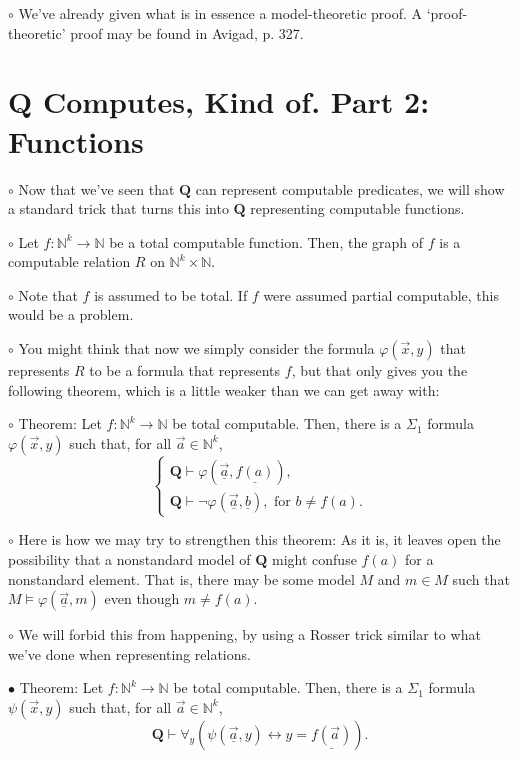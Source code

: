 \documentclass{article}
\newcommand{\N}{\mathbb{N}}
\newcommand{\RQ}{\mathbf{Q}}
\newcommand\Point[1]{\noindent \hspace{\labelsep} {\large $\bullet$ #1} \smallskip}
\newcommand\point[1]{\noindent \hspace{\labelsep} {\small $\circ$ #1} \smallskip}
\newcommand\timestamp[1]{}
\begin{document}
\point{We've already given what is in essence a model-theoretic proof. A `proof-theoretic' proof may be found in Avigad, p. 327.}

\timestamp{80 min}

\section{$\RQ$ Computes, Kind of. Part 2: Functions}

\point{Now that we've seen that $\RQ$ can represent computable predicates, we will show a standard trick that turns this into $\RQ$ representing computable functions.}

\point{Let $f \colon \N^k \to \N$ be a total computable function. Then, the graph of $f$ is a computable relation $R$ on $\N^k \times \N$.}

\point{Note that $f$ is assumed to be total. If $f$ were assumed partial computable, this would be a problem.}

\point{You might think that now we simply consider the formula $\varphi(\vec x, y)$ that represents $R$ to be a formula that represents $f$, but that only gives you the following theorem, which is a little weaker than we can get away with:}

\point{Theorem: Let $f \colon \N^k \to \N$ be total computable. Then, there is a $\Sigma_1$ formula $\varphi(\vec x, y)$ such that, for all $\vec a \in \N^k$,
\begin{equation}
\begin{cases}
\RQ \vdash \varphi(\underline{\vec a}, \underline{f(a)}),\\
\RQ \vdash \neg\varphi(\underline{\vec a}, \underline b), \text{ for $b \neq f(a)$}.
\end{cases}
\end{equation}}

\point{Here is how we may try to strengthen this theorem: As it is, it leaves open the possibility that a nonstandard model of $\RQ$ might confuse $f(a)$ for a nonstandard element. That is, there may be some model $M$ and $m \in M$ such that $M \vDash \varphi(\underline{\vec a}, m)$ even though $m \neq f(a)$.}

\point{We will forbid this from happening, by using a Rosser trick similar to what we've done when representing relations.}

\Point{Theorem: Let $f \colon \N^k \to \N$ be total computable. Then, there is a $\Sigma_1$ formula $\psi(\vec x, y)$ such that, for all $\vec a \in \N^k$,
\begin{equation}\label{eq:2}
\RQ \vdash \forall_y (\psi(\underline{\vec a}, y) \leftrightarrow y = \underline{f(\vec a)}).
\end{equation}}
\end{document}
